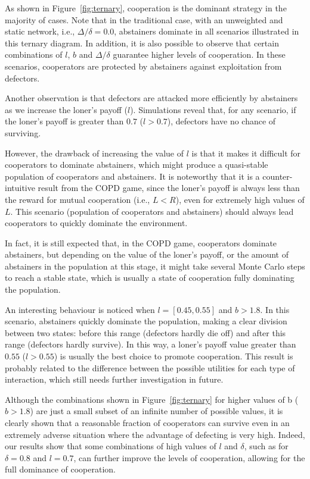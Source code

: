 \documentclass{llncs}
\begin{document}
As shown in Figure~\ref{fig:ternary}, cooperation is the dominant strategy in
the majority of cases. Note that in the traditional case, with an unweighted
and static network, i.e., $\Delta/\delta=0.0$, abstainers dominate in all
scenarios illustrated in this ternary diagram. In addition, it is also possible
to observe that certain combinations of $l$, $b$ and $\Delta/\delta$ guarantee
higher levels of cooperation. In these scenarios, cooperators are protected by
abstainers against exploitation from defectors.

Another observation is that defectors are attacked more efficiently by
abstainers as we increase the loner’s payoff ($l$). Simulations reveal that,
for any scenario, if the loner’s payoff is greater than $0.7$ ($l > 0.7$),
defectors have no chance of surviving.

However, the drawback of increasing the value of $l$ is that it makes it difficult
for cooperators to dominate abstainers, which might produce a quasi-stable
population of cooperators and abstainers. It is noteworthy that it is a
counter-intuitive result from the COPD game, since the loner’s payoff is always
less than the reward for mutual cooperation (i.e., $L < R$), even for extremely
high values of $L$. This scenario (population of cooperators and abstainers)
should always lead cooperators to quickly dominate the environment.

In fact, it is still expected that, in the COPD game, cooperators dominate
abstainers, but depending on the value of the loner’s payoff, or the amount of
abstainers in the population at this stage, it might take several Monte Carlo
steps to reach a stable state, which is usually a state of cooperation fully
dominating the population.

An interesting behaviour is noticed when $l=[0.45, 0.55]$ and $b > 1.8$. In
this scenario, abstainers quickly dominate the population, making a clear
division between two states: before this range (defectors hardly die off) and
after this range (defectors hardly survive). In this way, a loner’s payoff value
greater than $0.55$ ($l > 0.55$) is usually the best choice to promote
cooperation.  This result is probably related to the difference between the
possible utilities for each type of interaction, which still needs further
investigation in future.

Although the combinations shown in Figure~\ref{fig:ternary} for higher values
of b ($b>1.8$) are just a small subset of an infinite number of possible
values, it is clearly shown that a reasonable fraction of cooperators can
survive even in an extremely adverse situation where the advantage of defecting
is very high.  Indeed, our results show that some combinations of high values
of $l$ and $\delta$, such as for $\delta=0.8$ and $l=0.7$, can further improve the
levels of cooperation, allowing for the full dominance of cooperation.
\end{document}
